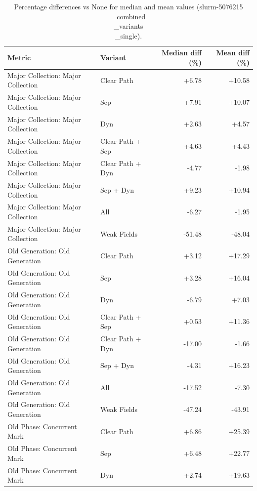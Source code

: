 \begin{table}[t]
\centering
\caption{Percentage differences vs None for median and mean values (slurm-5076215\\_combined\\_variants\\_single).}
\label{tab:gc_metric_pct_diff_slurm-5076215\\_combined\\_variants\\_single}
\begin{tabular}{llrr}
\toprule
Metric & Variant & Median diff (\%) & Mean diff (\%) \\
\midrule
Major Collection: Major Collection & Clear Path & +6.78 & +10.58 \\
Major Collection: Major Collection & Sep & +7.91 & +10.07 \\
Major Collection: Major Collection & Dyn & +2.63 & +4.57 \\
Major Collection: Major Collection & Clear Path + Sep & +4.63 & +4.43 \\
Major Collection: Major Collection & Clear Path + Dyn & -4.77 & -1.98 \\
Major Collection: Major Collection & Sep + Dyn & +9.23 & +10.94 \\
Major Collection: Major Collection & All & -6.27 & -1.95 \\
Major Collection: Major Collection & Weak Fields & -51.48 & -48.04 \\
Old Generation: Old Generation & Clear Path & +3.12 & +17.29 \\
Old Generation: Old Generation & Sep & +3.28 & +16.04 \\
Old Generation: Old Generation & Dyn & -6.79 & +7.03 \\
Old Generation: Old Generation & Clear Path + Sep & +0.53 & +11.36 \\
Old Generation: Old Generation & Clear Path + Dyn & -17.00 & -1.66 \\
Old Generation: Old Generation & Sep + Dyn & -4.31 & +16.23 \\
Old Generation: Old Generation & All & -17.52 & -7.30 \\
Old Generation: Old Generation & Weak Fields & -47.24 & -43.91 \\
Old Phase: Concurrent Mark & Clear Path & +6.86 & +25.39 \\
Old Phase: Concurrent Mark & Sep & +6.48 & +22.77 \\
Old Phase: Concurrent Mark & Dyn & +2.74 & +19.63 \\

\end{tabular}
\end{table}
